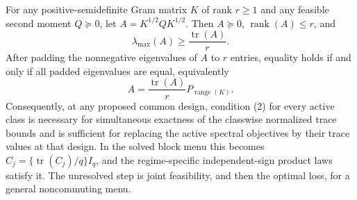 For any positive-semidefinite Gram matrix \(K\) of rank \(r\ge1\) and any feasible second moment \(Q\succeq0\), let \(A=K^{1/2}QK^{1/2}\). Then \(A\succeq0\), \(\operatorname{rank}(A)\le r\), and
\[
\lambda_{\max}(A)\ge\frac{\operatorname{tr}(A)}r. \tag{1}
\]
After padding the nonnegative eigenvalues of \(A\) to \(r\) entries, equality holds if and only if all padded eigenvalues are equal, equivalently
\[
A=\frac{\operatorname{tr}(A)}rP_{\operatorname{range}(K)}. \tag{2}
\]
Consequently, at any proposed common design, condition (2) for every active class is necessary for simultaneous exactness of the classwise normalized trace bounds and is sufficient for replacing the active spectral objectives by their trace values at that design. In the solved block menu this becomes \(C_j=\{\operatorname{tr}(C_j)/q\}I_q\), and the regime-specific independent-sign product laws satisfy it. The unresolved step is joint feasibility, and then the optimal loss, for a general noncommuting menu.